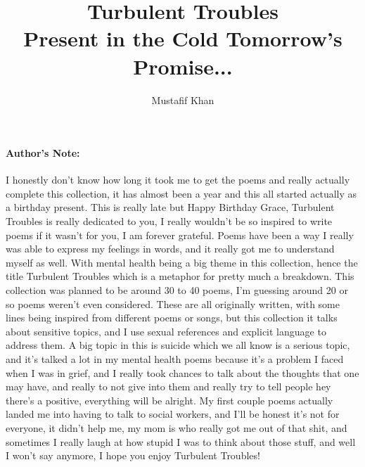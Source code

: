 \documentclass[12pt, b5paper]{article}
\title{\textbf {Turbulent Troubles} \\Present in the Cold Tomorrow's Promise...}
\author{Mustafif Khan}
\begin{document}
\maketitle
{}

\newpage 
\paragraph{Author's Note:\\}
\par I honestly don't know how long it took me to get the poems and really actually complete this collection, it has almost been a year 
and this all started actually as a birthday present. This is really late but Happy Birthday Grace, Turbulent Troubles is really dedicated to you, I really wouldn't be so inspired to write poems if it wasn't for you, I am forever grateful. Poems have been a way I really was able to express my feelings in words, and it really got me to understand myself as well. With mental health being a big theme in this collection, hence the title Turbulent Troubles which is a metaphor for pretty much a breakdown. This collection was planned to be around 30 to 40 poems, I'm guessing around 20 or so poems weren't even considered. These are all originally written, with some lines being inspired from different poems or songs, but this collection it talks about sensitive topics, and I use sexual references and explicit language to address them. A big topic in this is suicide which we all know is a serious topic, and it's talked a lot in my mental health poems because it's a problem I faced when I was in grief, and I really took chances to talk about the thoughts that one may have, and really to not give into them and really try to tell people hey there's a positive, everything will be alright. My first couple poems actually landed me into having to talk to social workers, and I'll be honest it's not for everyone, it didn't help me, my mom is who really got me out of that shit, and sometimes I really laugh at how stupid I was to think about those stuff, and well I won't say anymore, I hope you enjoy Turbulent Troubles! 

\newpage
\tableofcontents
\newpage
\end{document}
